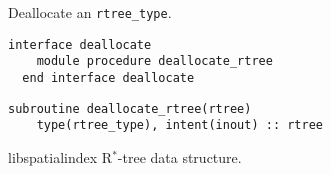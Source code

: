 \documentclass{article}
\begin{document}
\noindent Deallocate an \verb+rtree_type+.
  
\begin{lstlisting}[language=FORTRAN]
  interface deallocate
    module procedure deallocate_rtree
  end interface deallocate
\end{lstlisting}
  
\begin{lstlisting}[language=FORTRAN]  
  subroutine deallocate_rtree(rtree)
    type(rtree_type), intent(inout) :: rtree
\end{lstlisting}

\begin{description}[font=\ttfamily\bfseries,leftmargin=2.2\parindent,labelindent=1.7\parindent,noitemsep]
  \item[rtree] libspatialindex R${}^*$-tree data structure.
\end{description}



\end{document}
